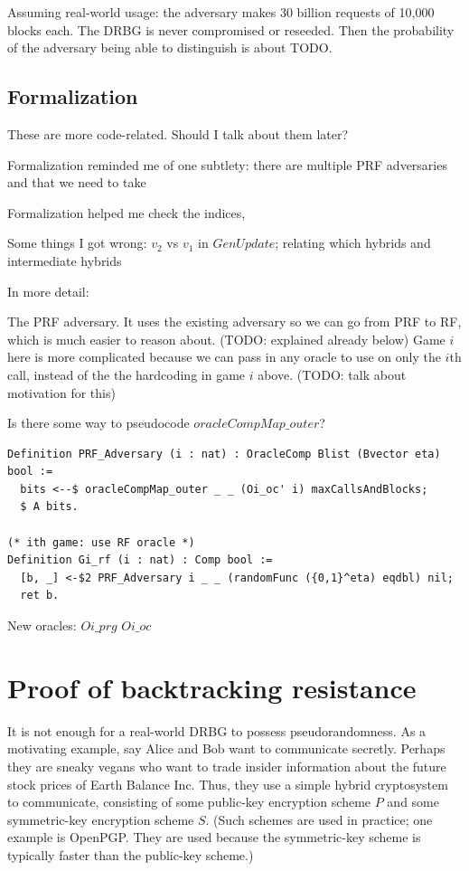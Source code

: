 \documentclass[12pt,lot, lof]{puthesis}
\begin{document}
{Assuming real-world usage: the adversary makes 30 billion requests of 10,000 blocks each. The DRBG is never compromised or reseeded. Then the probability of the adversary being able to distinguish is about TODO.

\subsection{Formalization}

These are more code-related. Should I talk about them later?

Formalization reminded me of one subtlety: there are multiple PRF adversaries and that we need to take 

Formalization helped me check the indices, 

Some things I got wrong: $v_2$ vs $v_1$ in $GenUpdate$; relating which hybrids and intermediate hybrids

In more detail:

The PRF adversary. It uses the existing adversary so we can go from PRF to RF, which is much easier to reason about. (TODO: explained already below) Game $i$ here is more complicated because we can pass in any oracle to use on only the $i$th call, instead of the the hardcoding in game $i$ above. (TODO: talk about motivation for this)

Is there some way to pseudocode $oracleCompMap\_outer$?

\begin{lstlisting}
Definition PRF_Adversary (i : nat) : OracleComp Blist (Bvector eta) bool :=
  bits <--$ oracleCompMap_outer _ _ (Oi_oc' i) maxCallsAndBlocks;
  $ A bits.

(* ith game: use RF oracle *)
Definition Gi_rf (i : nat) : Comp bool :=
  [b, _] <-$2 PRF_Adversary i _ _ (randomFunc ({0,1}^eta) eqdbl) nil;
  ret b.
\end{lstlisting}

New oracles:
$Oi\_prg$
$Oi\_oc$


\section{Proof of backtracking resistance}

It is not enough for a real-world DRBG to possess pseudorandomness. As a motivating example, say Alice and Bob want to communicate secretly. Perhaps they are sneaky vegans who want to trade insider information about the future stock prices of Earth Balance Inc. Thus, they use a simple hybrid cryptosystem to communicate, consisting of some public-key encryption scheme $P$ and some symmetric-key encryption scheme $S$. (Such schemes are used in practice; one example is OpenPGP. They are used because the symmetric-key scheme is typically faster than the public-key scheme.)

}
\end{document}
